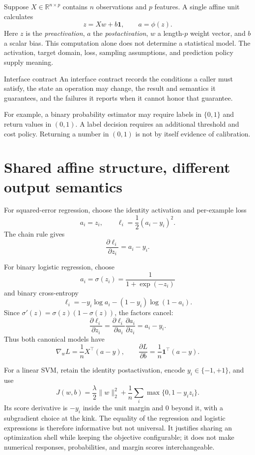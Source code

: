 Suppose $X\in\mathbb R^{n\times p}$ contains $n$ observations and $p$
features. A single affine unit calculates
\[
  z=Xw+b\mathbf 1,
  \qquad
  a=\phi(z).
\]
Here $z$ is the \emph{preactivation}, $a$ the \emph{postactivation}, $w$ a
length-$p$ weight vector, and $b$ a scalar bias. This computation alone does
not determine a statistical model. The activation, target domain, loss,
sampling assumptions, and prediction policy supply meaning.

\begin{definitionbox}{Interface contract}
An interface contract records the conditions a caller must satisfy, the state
an operation may change, the result and semantics it guarantees, and the
failures it reports when it cannot honor that guarantee.
\end{definitionbox}

For example, a binary probability estimator may require labels in
$\{0,1\}$ and return values in $(0,1)$. A label decision requires an additional
threshold and cost policy. Returning a number in $(0,1)$ is not by itself
evidence of calibration.


\section{Shared affine structure, different output semantics}

For squared-error regression, choose the identity activation and per-example
loss
\[
  a_i=z_i,
  \qquad
  \ell_i=\frac12(a_i-y_i)^2.
\]
The chain rule gives
\[
  \frac{\partial\ell_i}{\partial z_i}=a_i-y_i.
\]

For binary logistic regression, choose
\[
  a_i=\sigma(z_i)=\frac{1}{1+\exp(-z_i)}
\]
and binary cross-entropy
\[
  \ell_i=-y_i\log a_i-(1-y_i)\log(1-a_i).
\]
Since $\sigma'(z)=\sigma(z)(1-\sigma(z))$, the factors cancel:
\[
  \frac{\partial\ell_i}{\partial z_i}
  =
  \frac{\partial\ell_i}{\partial a_i}
  \frac{\partial a_i}{\partial z_i}
  =a_i-y_i.
\]
Thus both canonical models have
\[
  \nabla_w L=\frac1nX^\top(a-y),
  \qquad
  \frac{\partial L}{\partial b}
  =\frac1n\mathbf 1^\top(a-y).
\]

For a linear SVM, retain the identity postactivation, encode
$y_i\in\{-1,+1\}$, and use
\[
  J(w,b)=\frac{\lambda}{2}\lVert w\rVert_2^2
  +\frac1n\sum_i\max\{0,1-y_i z_i\}.
\]
Its score derivative is $-y_i$ inside the unit margin and $0$ beyond it, with
a subgradient choice at the kink. The equality of the regression and logistic
expressions is therefore informative but not universal. It justifies sharing
an optimization shell while keeping the objective configurable; it does not
make numerical responses, probabilities, and margin scores interchangeable.

